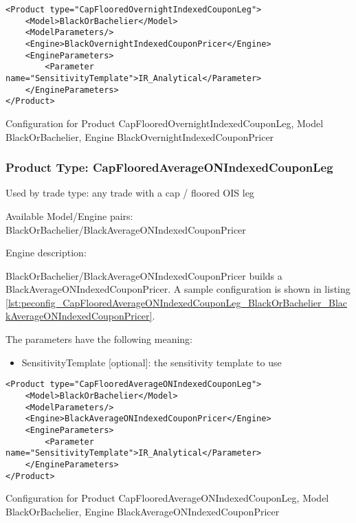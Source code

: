 \begin{longlisting}
\begin{verbatim}
<Product type="CapFlooredOvernightIndexedCouponLeg">
    <Model>BlackOrBachelier</Model>
    <ModelParameters/>
    <Engine>BlackOvernightIndexedCouponPricer</Engine>
    <EngineParameters>
        <Parameter name="SensitivityTemplate">IR_Analytical</Parameter>
    </EngineParameters>
</Product>
\end{verbatim}
\caption{Configuration for Product CapFlooredOvernightIndexedCouponLeg, Model BlackOrBachelier, Engine BlackOvernightIndexedCouponPricer}
\label{lst:peconfig_CapFlooredOvernightIndexedCouponLeg_BlackOrBachelier_BlackOvernightIndexedCouponPricer}
\end{longlisting}

\subsubsection{Product Type: CapFlooredAverageONIndexedCouponLeg}

Used by trade type: any trade with a cap / floored OIS leg

Available Model/Engine pairs: BlackOrBachelier/BlackAverageONIndexedCouponPricer

Engine description:

BlackOrBachelier/BlackAverageONIndexedCouponPricer builds a BlackAverageONIndexedCouponPricer. A sample configuration is
shown in listing \ref{lst:peconfig_CapFlooredAverageONIndexedCouponLeg_BlackOrBachelier_BlackAverageONIndexedCouponPricer}.

The parameters have the following meaning:

\begin{itemize}
\item SensitivityTemplate [optional]: the sensitivity template to use 
\end{itemize}

\begin{longlisting}
\begin{verbatim}
<Product type="CapFlooredAverageONIndexedCouponLeg">
    <Model>BlackOrBachelier</Model>
    <ModelParameters/>
    <Engine>BlackAverageONIndexedCouponPricer</Engine>
    <EngineParameters>
        <Parameter name="SensitivityTemplate">IR_Analytical</Parameter>
    </EngineParameters>
</Product>
\end{verbatim}
\caption{Configuration for Product CapFlooredAverageONIndexedCouponLeg, Model BlackOrBachelier, Engine BlackAverageONIndexedCouponPricer}
\label{lst:peconfig_CapFlooredAverageONIndexedCouponLeg_BlackOrBachelier_BlackAverageONIndexedCouponPricer}
\end{longlisting}

